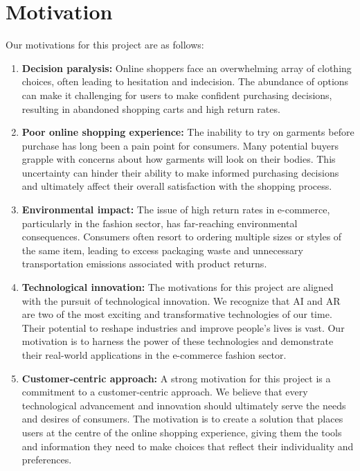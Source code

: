 \section{Motivation}
	Our motivations for this project are as follows:

	\begin{enumerate}
		\item \textbf{Decision paralysis:} Online shoppers face an overwhelming array of clothing choices, often leading to hesitation and indecision. The abundance of options can make it challenging for users to make confident purchasing decisions, resulting in abandoned shopping carts and high return rates.
		\item \textbf{Poor online shopping experience:} The inability to try on garments before purchase has long been a pain point for consumers. Many potential buyers grapple with concerns about how garments will look on their bodies. This uncertainty can hinder their ability to make informed purchasing decisions and ultimately affect their overall satisfaction with the shopping process.
		\item \textbf{Environmental impact:} The issue of high return rates in e-commerce, particularly in the fashion sector, has far-reaching environmental consequences. Consumers often resort to ordering multiple sizes or styles of the same item, leading to excess packaging waste and unnecessary transportation emissions associated with product returns.
		\item \textbf{Technological innovation:} The motivations for this project are aligned with the pursuit of technological innovation. We recognize that AI and AR are two of the most exciting and transformative technologies of our time. Their potential to reshape industries and improve people's lives is vast. Our motivation is to harness the power of these technologies and demonstrate their real-world applications in the e-commerce fashion sector.
		\item \textbf{Customer-centric approach:} A strong motivation for this project is a commitment to a customer-centric approach. We believe that every technological advancement and innovation should ultimately serve the needs and desires of consumers. The motivation is to create a solution that places users at the centre of the online shopping experience, giving them the tools and information they need to make choices that reflect their individuality and preferences.
	\end{enumerate}